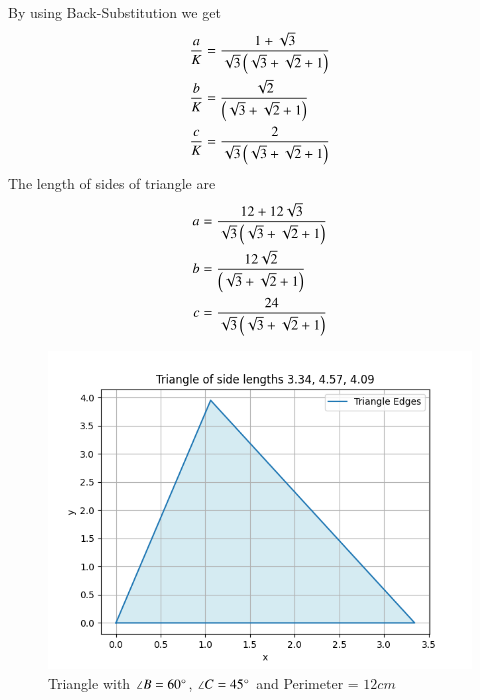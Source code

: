 \documentclass[journal]{IEEEtran}
\begin{document}
By using Back-Substitution we get
\begin{align}
\frac{a}{K}&=\frac{1+\sqrt{3}}{\sqrt{3}\left(\sqrt{3}+\sqrt{2}+1\right)}\\
\frac{b}{K}&=\frac{\sqrt{2}}{\left(\sqrt{3}+\sqrt{2}+1\right)}\\
\frac{c}{K}&=\frac{2}{\sqrt{3}\left(\sqrt{3}+\sqrt{2}+1\right)}
\end{align}
The length of sides of triangle are
\begin{align}
a&=\frac{12+12\sqrt{3}}{\sqrt{3}\left(\sqrt{3}+\sqrt{2}+1\right)}\\
b&=\frac{12\sqrt{2}}{\left(\sqrt{3}+\sqrt{2}+1\right)}\\
c&=\frac{24}{\sqrt{3}\left(\sqrt{3}+\sqrt{2}+1\right)}
\end{align}
\begin{figure}[h!]
   \centering
   \includegraphics[width=0.7\linewidth]{figs/fig.png}
   \caption{Triangle with $\angle B=60\degree$, $\angle C=45\degree$ and Perimeter = $12cm$}
\end{figure}
\end{document}
